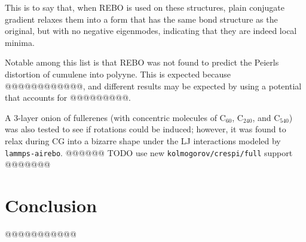 \documentclass[11pt]{article}
\theoremstyle{definition}
\theoremstyle{remark}
\newcommand{\chem}[1]{\ensuremath{\mathrm{#1}}}
\begin{document}
This is to say that, when REBO is used on these structures, plain conjugate gradient relaxes them into a form that has the same bond structure as the original, but with no negative eigenmodes, indicating that they are indeed local minima.

Notable among this list is that REBO was not found to predict the Peierls distortion of cumulene into polyyne.  This is expected because @@@@@@@@@@@@, and different results may be expected by using a potential that accounts for @@@@@@@@@.

A 3-layer onion of fullerenes (with concentric molecules of $\chem{C_{60}}$, $\chem{C_{240}}$, and $\chem{C_{540}}$) was also tested to see if rotations could be induced; however, it was found to relax during CG into a bizarre shape under the LJ interactions modeled by \verb|lammps-airebo|. @@@@@@ TODO use new \verb|kolmogorov/crespi/full| support @@@@@@@

\section{Conclusion}

@@@@@@@@@@@
\end{document}
